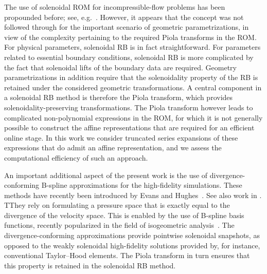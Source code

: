\documentclass[onecolumn, twoside, a4paper, 11pt]{article}
\begin{document}
The use of solenoidal ROM for incompressible-flow problems has been propounded before;
see, e.g.~\cite{Ballarin2015ssp,Lovgren2006rbe}. However, it appears that the concept was not followed
through for the important scenario of geometric parametrizations, in view of the complexity pertaining
to the required Piola transforms in the ROM. For physical parameters, solenoidal RB is in fact
straightforward. For parameters
related to essential boundary conditions, solenoidal RB is more complicated by the fact that solenoidal
lifts of the boundary data are required. Geometry parametrizations in addition require that the
solenoidality property of the RB is retained under the considered geometric transformations. A
central component in a solenoidal RB method is therefore the Piola transform, which provides
solenoidality-preserving transformations. The Piola transform however leads to complicated
non-polynomial expressions in the ROM, for which it is not generally possible to construct
the affine representations that are required for an efficient online stage. In this work we consider
truncated series expansions of these expressions that do admit an affine representation, and
we assess the computational efficiency of such an approach.

An important additional aspect of the present work is the use of divergence-conforming B-spline
approximations for the high-fidelity simulations. These methods have recently been introduced
by Evans and Hughes~\cite{Evans2012dsa,Evans2013idc1,Evans2013idc2,Evans2013idc3}. See also work in
\cite{Buffa2011ias,vanOpstal2017idc}.
TThey rely on formulating a pressure space that
is exactly equal to the divergence of the velocity space. This is enabled by the use of
B-spline basis functions, recently popularized in the field of isogeometric
analysis~\cite{Cottrell2009iat}. The divergence-conforming approximations provide pointwise
solenoidal snapshots, as opposed to the weakly solenoidal high-fidelity solutions provided by, for
instance, conventional Taylor--Hood elements. The Piola transform in turn ensures that this property
is retained in the solenoidal RB method.
\end{document}
